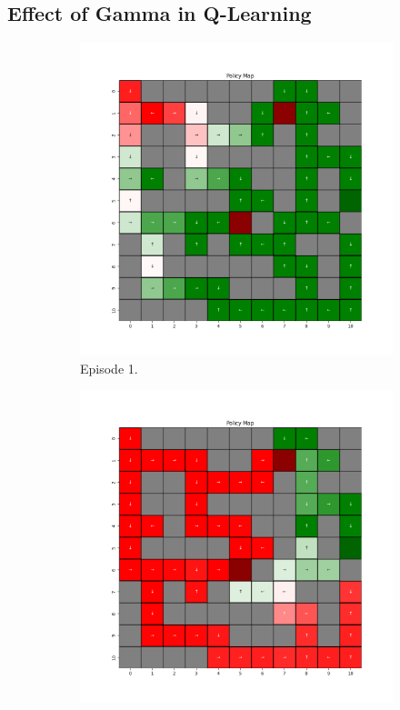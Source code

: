 \documentclass{assignment}
\begin{document}
\subsection{Effect of Gamma in Q-Learning}

\begin{figure}[H]
    \begin{subfigure}{0.3\textwidth}
        \includegraphics[width=\textwidth]{figures/policy_q/gamma_sweep/policy_alpha_0.1_gamma_0.1_epsilon_0.2_iteration_1.png}
    \caption{Episode 1.}
    \end{subfigure}\hfill
    \begin{subfigure}{0.3\textwidth}
        \includegraphics[width=\textwidth]{figures/policy_q/gamma_sweep/policy_alpha_0.1_gamma_0.1_epsilon_0.2_iteration_50.png}

\end{subfigure}
\end{figure}
\end{document}
